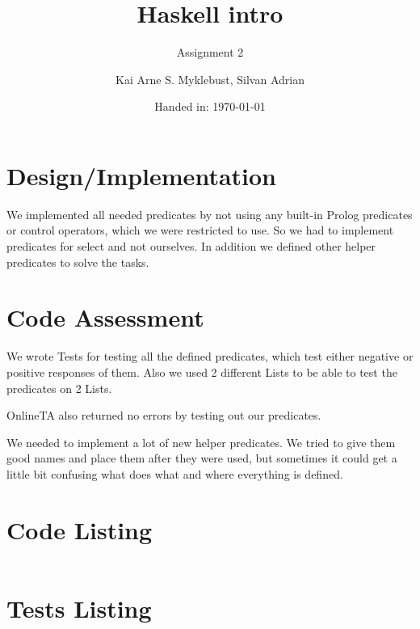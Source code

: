 \documentclass[12pt,a4paper]{article}
\begin{document}
\title{Haskell intro}
\subtitle{Assignment 2}

\author{Kai Arne S. Myklebust, Silvan Adrian}
\date{Handed in: \today}
	
\maketitle
\tableofcontents

\section{Design/Implementation}

We implemented all needed predicates by not using any built-in Prolog predicates or control operators, which we were restricted to use.
So we had to implement predicates for select and not ourselves. In addition we defined other helper predicates to solve the tasks.

\section{Code Assessment}
We wrote Tests for testing all the defined predicates, which test either negative or positive responses of them.
Also we used 2 different Lists to be able to test the predicates on 2 Lists.

OnlineTA also returned no errors by testing out our predicates.

We needed to implement a lot of new helper predicates. We tried to give them good names and place them after they were used, but sometimes it could get a little bit confusing what does what and where everything is defined.

\appendix
\section{Code Listing}

\inputminted{prolog}{handin/twitbook.pl}

\section{Tests Listing}

\inputminted{prolog}{handin/tests.pl}
\end{document}
